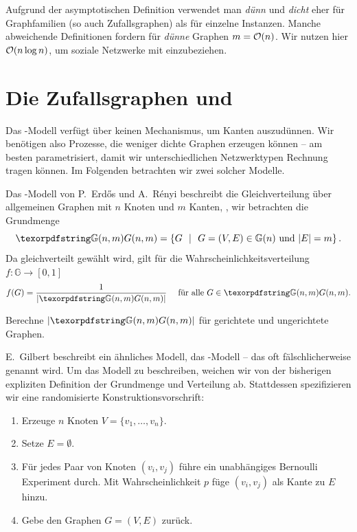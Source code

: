 \begin{remark}
    Aufgrund der asymptotischen Definition verwendet man \emph{dünn} und \emph{dicht} eher für Graphfamilien (so auch Zufallsgraphen) als für einzelne Instanzen.
    Manche abweichende Definitionen fordern für \emph{dünne} Graphen $m = \mathcal{O}\!\left(n\right)$.
    Wir nutzen hier $\mathcal{O}\!\left(n\log n\right)$, um soziale Netzwerke mit einzubeziehen.
\end{remark}

\section{Die Zufallsgraphen \Gnm und \Gnp}
Das \Gn-Modell verfügt über keinen Mechanismus, um Kanten auszudünnen.
Wir benötigen also Prozesse, die weniger dichte Graphen erzeugen können --
am besten parametrisiert, damit wir unterschiedlichen Netzwerktypen Rechnung tragen können.
Im Folgenden betrachten wir zwei solcher Modelle.

Das \Gnm-Modell  von P.~Erd\H{o}s und A.~R\'enyi beschreibt die Gleichverteilung über allgemeinen Graphen mit $n$ Knoten und $m$ Kanten, \dh, wir betrachten die Grundmenge
\begin{equation}
    \gGnm = \twoset{G}{G=(V,E) \in \mathbb G(n) \textnormal{ und } |E| = m}.
\end{equation}
Da gleichverteilt gewählt wird, gilt für die Wahrscheinlichkeitsverteilung~{$f\colon \mathbb G \to [0,1]$}
\begin{equation}
    f(G) = \frac{1}{| \gGnm |} \quad \text{ für alle } G \in \gGnm.
\end{equation}

\begin{exercise}
    Berechne $|\gGnm|$ für gerichtete und ungerichtete Graphen.
\end{exercise}

E.~Gilbert  beschreibt ein ähnliches Modell, das \Gnp-Modell -- das oft fälschlicherweise  genannt wird.
Um das Modell zu beschreiben, weichen wir von der bisherigen expliziten Definition der Grundmenge und Verteilung ab.
Stattdessen spezifizieren wir eine randomisierte Konstruktionsvorschrift:
\begin{enumerate}
    \item Erzeuge $n$ Knoten $V = \{v_1, \ldots, v_n\}$.
    \item Setze $E = \emptyset$.
    \item Für jedes Paar von Knoten $(v_i, v_j)$ führe ein unabhängiges Bernoulli Experiment durch.
          Mit Wahrscheinlichkeit $p$ füge $(v_i, v_j)$ als Kante zu $E$ hinzu.
    \item Gebe den Graphen $G=(V, E)$ zurück.
\end{enumerate}

